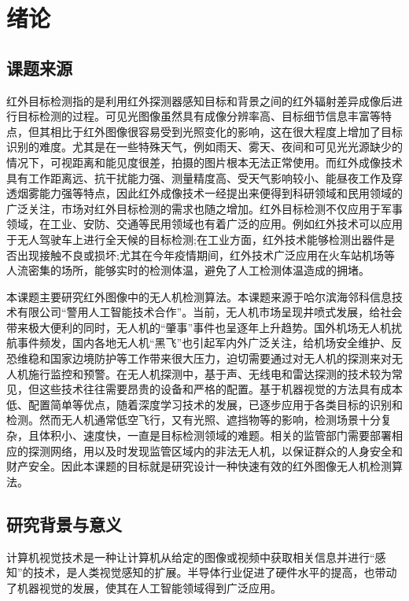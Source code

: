 \chapter{绪论}

\section{课题来源}
红外目标检测指的是利用红外探测器感知目标和背景之间的红外辐射差异成像后进行目标检测的过程。可见光图像虽然具有成像分辨率高、目标细节信息丰富等特点，但其相比于红外图像很容易受到光照变化的影响，这在很大程度上增加了目标识别的难度。尤其是在一些特殊天气，例如雨天、雾天、夜间和可见光光源缺少的情况下，可视距离和能见度很差，拍摄的图片根本无法正常使用。而红外成像技术具有工作距离远、抗干扰能力强、测量精度高、受天气影响较小、能昼夜工作及穿透烟雾能力强等特点，因此红外成像技术一经提出来便得到科研领域和民用领域的广泛关注，市场对红外目标检测的需求也随之增加。红外目标检测不仅应用于军事领域，在工业、安防、交通等民用领域也有着广泛的应用。例如红外技术可以应用于无人驾驶车上进行全天候的目标检测;在工业方面，红外技术能够检测出器件是否出现接触不良或损坏;尤其在今年疫情期间，红外技术广泛应用在火车站机场等人流密集的场所，能够实时的检测体温，避免了人工检测体温造成的拥堵。

本课题主要研究红外图像中的无人机检测算法。本课题来源于哈尔滨海邻科信息技术有限公司“警用人工智能技术合作”。当前，无人机市场呈现井喷式发展，给社会带来极大便利的同时，无人机的“肇事”事件也呈逐年上升趋势。国外机场无人机扰航事件频发，国内各地无人机“黑飞”也引起军内外广泛关注，给机场安全维护、反恐维稳和国家边境防护等工作带来很大压力，迫切需要通过对无人机的探测来对无人机施行监控和预警。在无人机探测中，基于声、无线电和雷达探测的技术较为常见，但这些技术往往需要昂贵的设备和严格的配置。基于机器视觉的方法具有成本低、配置简单等优点，随着深度学习技术的发展，已逐步应用于各类目标的识别和检测。然而无人机通常低空飞行，又有光照、遮挡物等的影响，检测场景十分复杂，且体积小、速度快，一直是目标检测领域的难题。相关的监管部门需要部署相应的探测网络，用以及时发现监管区域内的非法无人机，以保证群众的人身安全和财产安全。因此本课题的目标就是研究设计一种快速有效的红外图像无人机检测算法。

\section{研究背景与意义}
计算机视觉技术是一种让计算机从给定的图像或视频中获取相关信息并进行“感知”的技术，是人类视觉感知的扩展。半导体行业促进了硬件水平的提高，也带动了机器视觉的发展，使其在人工智能领域得到广泛应用。

